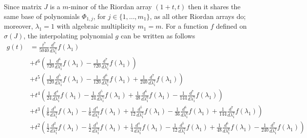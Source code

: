Since matrix $J$ is a $m$-minor of the Riordan array $\left(1+t, t\right)$ then
it shares the same base of polynomials $\Phi_{1, j}$, for
$j\in\lbrace1,\ldots,m_{1} \rbrace$, as all other Riordan arrays do; moreover,
$\lambda_{1}=1$ with algebraic multiplicity $m_{1}=m$. For a function $f$ defined on $\sigma(J)$, 
the interpolating polynomial $g$ can be written as follows
\begin{displaymath}
\begin{split}
g{\left (t \right )} &= \frac{t^{7}}{5040} \frac{d^{7}}{d \lambda_{1}^{7}}  f{\left (\lambda_{1} \right )} \\
                     &+ t^{6} \left(\frac{1}{720} \frac{d^{6}}{d \lambda_{1}^{6}}  f{\left (\lambda_{1} \right )} - \frac{1}{720} \frac{d^{7}}{d \lambda_{1}^{7}}  f{\left (\lambda_{1} \right )}\right) \\
                     &+ t^{5} \left(\frac{1}{120} \frac{d^{5}}{d \lambda_{1}^{5}}  f{\left (\lambda_{1} \right )} - \frac{1}{120} \frac{d^{6}}{d \lambda_{1}^{6}}  f{\left (\lambda_{1} \right )} + \frac{1}{240} \frac{d^{7}}{d \lambda_{1}^{7}}  f{\left (\lambda_{1} \right )}\right) \\
                     &+ t^{4} \left(\frac{1}{24} \frac{d^{4}}{d \lambda_{1}^{4}}  f{\left (\lambda_{1} \right )} - \frac{1}{24} \frac{d^{5}}{d \lambda_{1}^{5}}  f{\left (\lambda_{1} \right )} + \frac{1}{48} \frac{d^{6}}{d \lambda_{1}^{6}}  f{\left (\lambda_{1} \right )} - \frac{1}{144} \frac{d^{7}}{d \lambda_{1}^{7}}  f{\left (\lambda_{1} \right )}\right) \\
                     &+ t^{3} \left(\frac{1}{6} \frac{d^{3}}{d \lambda_{1}^{3}}  f{\left (\lambda_{1} \right )} - \frac{1}{6} \frac{d^{4}}{d \lambda_{1}^{4}}  f{\left (\lambda_{1} \right )} + \frac{1}{12} \frac{d^{5}}{d \lambda_{1}^{5}}  f{\left (\lambda_{1} \right )} - \frac{1}{36} \frac{d^{6}}{d \lambda_{1}^{6}}  f{\left (\lambda_{1} \right )} + \frac{1}{144} \frac{d^{7}}{d \lambda_{1}^{7}}  f{\left (\lambda_{1} \right )}\right) \\
                     &+ t^{2} \left(\frac{1}{2} \frac{d^{2}}{d \lambda_{1}^{2}}  f{\left (\lambda_{1} \right )} - \frac{1}{2} \frac{d^{3}}{d \lambda_{1}^{3}}  f{\left (\lambda_{1} \right )} + \frac{1}{4} \frac{d^{4}}{d \lambda_{1}^{4}}  f{\left (\lambda_{1} \right )} - \frac{1}{12} \frac{d^{5}}{d \lambda_{1}^{5}}  f{\left (\lambda_{1} \right )} + \frac{1}{48} \frac{d^{6}}{d \lambda_{1}^{6}}  f{\left (\lambda_{1} \right )} - \frac{1}{240} \frac{d^{7}}{d \lambda_{1}^{7}}  f{\left (\lambda_{1} \right )}\right) \\

\end{split}
\end{displaymath}
